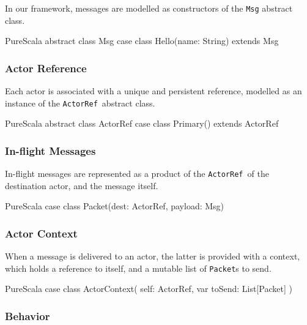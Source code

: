 \documentclass[a4paper,twoside]{article}
\newcommand{\InlineS}[1]{\lstinline[language=PureScala,basicstyle=\small\ttfamily,columns=fixed]|#1|}
\newcommand{\ActorRef}{\InlineS{ActorRef}\ }
\begin{document}
\begin{enumerate}
In our framework, messages are modelled as constructors of the \InlineS{Msg} abstract class.

\begin{ShortCode}{PureScala}
abstract class Msg
case class Hello(name: String) extends Msg
\end{ShortCode}

\vspace{-15pt}
\subsubsection*{Actor Reference}

Each actor is associated with a unique and persistent reference, modelled as an instance of the \ActorRef abstract class.

\begin{ShortCode}{PureScala}
abstract class ActorRef
case class Primary() extends ActorRef
\end{ShortCode}

\vspace{-15pt}
\subsubsection*{In-flight Messages}

In-flight messages are represented as a product of the \ActorRef of the destination actor, and the message itself.

\begin{ShortCode}{PureScala}
case class Packet(dest: ActorRef, payload: Msg)
\end{ShortCode}

\vspace{-15pt}
\subsubsection*{Actor Context}

When a message is delivered to an actor, the latter is provided with a context,
which holds a reference to itself, and a mutable list of \InlineS{Packet}s to send.

\begin{ShortCode}{PureScala}
case class ActorContext(
  self: ActorRef,
  var toSend: List[Packet]
)
\end{ShortCode}

\vspace{-15pt}
\subsubsection*{Behavior}


\end{enumerate}
\end{document}
